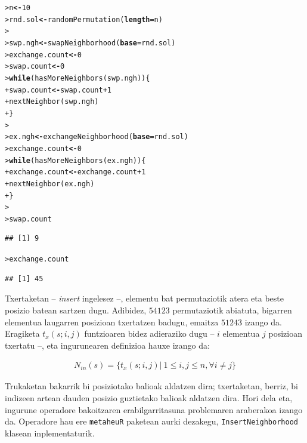 \documentclass[eu]{ifirak}\usepackage[]{graphicx}\usepackage[]{color}
\makeatletter
\newcommand{\hlnum}[1]{\textcolor[rgb]{0.659,0.4,0.051}{#1}}%
\newcommand{\hlopt}[1]{\textcolor[rgb]{0,0,0}{#1}}%
\newcommand{\hlstd}[1]{\textcolor[rgb]{0,0,0}{#1}}%
\newcommand{\hlkwa}[1]{\textcolor[rgb]{0.133,0.224,0.659}{\textbf{#1}}}%
\newcommand{\hlkwb}[1]{\textcolor[rgb]{0.549,0.114,0.412}{\textbf{#1}}}%
\newcommand{\hlkwc}[1]{\textcolor[rgb]{0.659,0.573,0.133}{\textbf{#1}}}%
\newcommand{\hlkwd}[1]{\textcolor[rgb]{0.659,0.133,0.482}{#1}}%
\newenvironment{kframe}{%
 \def\at@end@of@kframe{}%
 \ifinner\ifhmode%
  \def\at@end@of@kframe{\end{minipage}}%
  \begin{minipage}{\columnwidth}%
 \fi\fi%
 \def\FrameCommand##1{\hskip\@totalleftmargin \hskip-\fboxsep
 \colorbox{shadecolor}{##1}\hskip-\fboxsep
     \hskip-\linewidth \hskip-\@totalleftmargin \hskip\columnwidth}%
 \MakeFramed {\advance\hsize-\width
   \@totalleftmargin\z@ \linewidth\hsize
   \@setminipage}}%
 {\par\unskip\endMakeFramed%
 \at@end@of@kframe}
\newenvironment{knitrout}{}{} %
\newcommand{\code}[1]{\texttt{#1}}
\makeatother
\begin{document}
\begin{knitrout}
\color{fgcolor}\begin{kframe}
\begin{alltt}
\hlstd{> }\hlstd{n} \hlkwb{<-} \hlnum{10}
\hlstd{> }\hlstd{rnd.sol} \hlkwb{<-} \hlkwd{randomPermutation}\hlstd{(}\hlkwc{length}\hlstd{=n)}
\hlstd{> }
\hlstd{> }\hlstd{swp.ngh} \hlkwb{<-} \hlkwd{swapNeighborhood}\hlstd{(}\hlkwc{base}\hlstd{=rnd.sol)}
\hlstd{> }\hlstd{exchange.count} \hlkwb{<-} \hlnum{0}
\hlstd{> }\hlstd{swap.count} \hlkwb{<-} \hlnum{0}
\hlstd{> }\hlkwa{while}\hlstd{(}\hlkwd{hasMoreNeighbors}\hlstd{(swp.ngh)) \{}
\hlstd{+ }  \hlstd{swap.count} \hlkwb{<-} \hlstd{swap.count} \hlopt{+} \hlnum{1}
\hlstd{+ }  \hlkwd{nextNeighbor}\hlstd{(swp.ngh)}
\hlstd{+ }\hlstd{\}}
\hlstd{> }
\hlstd{> }\hlstd{ex.ngh} \hlkwb{<-} \hlkwd{exchangeNeighborhood}\hlstd{(}\hlkwc{base}\hlstd{=rnd.sol)}
\hlstd{> }\hlstd{exchange.count} \hlkwb{<-} \hlnum{0}
\hlstd{> }\hlkwa{while}\hlstd{(}\hlkwd{hasMoreNeighbors}\hlstd{(ex.ngh)) \{}
\hlstd{+ }  \hlstd{exchange.count} \hlkwb{<-} \hlstd{exchange.count} \hlopt{+} \hlnum{1}
\hlstd{+ }  \hlkwd{nextNeighbor}\hlstd{(ex.ngh)}
\hlstd{+ }\hlstd{\}}
\hlstd{> }
\hlstd{> }\hlstd{swap.count}
\end{alltt}
\begin{verbatim}
## [1] 9
\end{verbatim}
\begin{alltt}
\hlstd{> }\hlstd{exchange.count}
\end{alltt}
\begin{verbatim}
## [1] 45
\end{verbatim}
\end{kframe}
\end{knitrout}

Txertaketan -- \textit{insert} ingelesez --, elementu bat permutaziotik atera eta beste posizio batean sartzen dugu. Adibidez, $54123$ permutaziotik abiatuta, bigarren elementua laugarren posizioan txertatzen badugu, emaitza $51243$ izango da. Eragiketa $t_x(s;i,j)$ funtzioaren bidez adieraziko dugu -- $i$ elementua $j$ posizioan txertatu --, eta ingurunearen definizioa hauxe izango da:

\begin{align}
N_{in}(s) = \{t_x(s;i,j)|\ 1 \leq i,j\leq n, \forall i \neq j\}
\end{align}

Trukaketan bakarrik bi posiziotako balioak aldatzen dira; txertaketan, berriz, bi indizeen artean dauden posizio guztietako balioak aldatzen dira. Hori dela eta, ingurune operadore bakoitzaren erabilgarritasuna problemaren araberakoa izango da. Operadore hau ere \code{metaheuR} paketean aurki dezakegu, \code{InsertNeighborhood} klasean inplementaturik.
\end{document}
